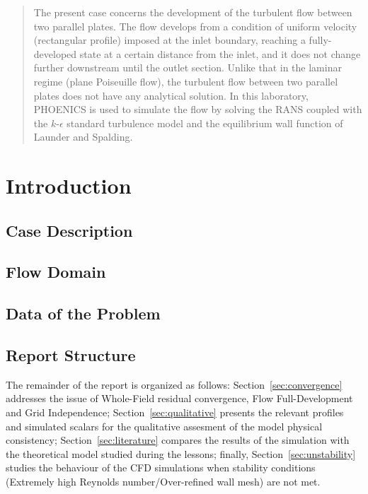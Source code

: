 \documentclass[12pt]{article}
\begin{document}
\maketitle

\begin{abstract}
        The present case concerns the development of the turbulent flow between two parallel plates. The flow develops from a condition of uniform velocity (rectangular profile) imposed at the inlet boundary, reaching a fully-developed state at a certain distance from the inlet, and it does not change further downstream until the outlet section. Unlike that in the laminar regime (plane Poiseuille flow), the turbulent flow between two parallel plates does not have any analytical solution. In this laboratory, PHOENICS is used to simulate the flow by solving the RANS coupled with the \( k \text{-} \epsilon\) standard turbulence model and the equilibrium wall function of Launder and Spalding. \cite{FL:03}
\end{abstract}

\section{Introduction}

        \subsection{Case Description}
        
        \subsection{Flow Domain}
        
        \subsection{Data of the Problem}
        
        \subsection{Report Structure}

                The remainder of the report is organized as follows: Section~\ref{sec:convergence} addresses the issue of Whole-Field residual convergence, Flow Full-Development and Grid Independence; Section~\ref{sec:qualitative} presents the relevant profiles and simulated scalars for the qualitative assesment of the model physical consistency; Section~\ref{sec:literature} compares the results of the simulation with the theoretical model studied during the lessons; finally, Section~\ref{sec:unstability} studies the behaviour of the CFD simulations when stability conditions (Extremely high Reynolds number/Over-refined wall mesh) are not met.
\end{document}
